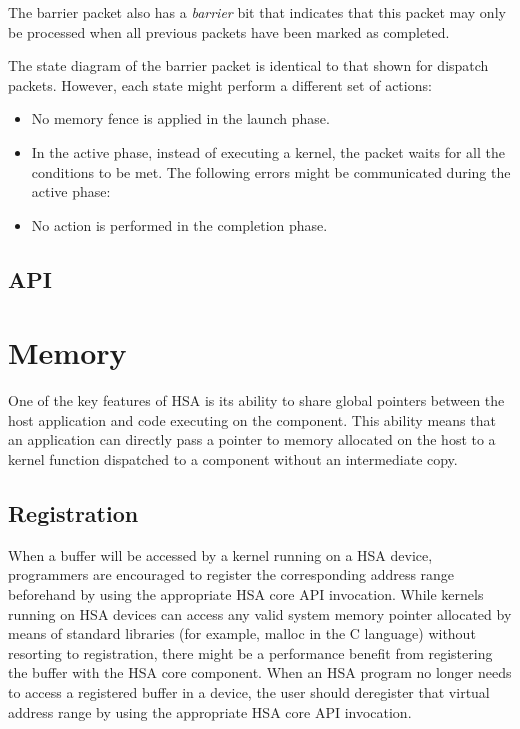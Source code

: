 \documentclass[final]{book}
\newcommand{\reffld}[1]{\textit{#1}}
\begin{document}
The barrier packet also has a \reffld{barrier} bit that indicates that this
packet may only be processed when all previous packets have been marked as
completed.

The state diagram of the barrier packet is identical to that shown for dispatch
packets. However, each state might perform a different set of actions:
\begin{itemize}
\item No memory fence is applied in the launch phase.
\item In the active phase, instead of executing a kernel, the packet waits for
  all the conditions to be met. The following errors might be communicated
  during the active phase: 
\item No action is performed in the completion phase.
\end{itemize}

\subsection{API}


\section{Memory}\label{memory}\hypertarget{memory}{}

One of the key features of HSA is its ability to share global pointers between
the host application and code executing on the component. This ability means
that an application can directly pass a pointer to memory allocated on the host
to a kernel function dispatched to a component without an intermediate copy.

\hypertarget{memory-registration}{}\subsection{Registration}\label{memory-registration}

When a buffer will be accessed by a kernel running on a HSA device, programmers
are encouraged to register the corresponding address range beforehand by using
the appropriate HSA core API invocation. While kernels running on HSA devices
can access any valid system memory pointer allocated by means of standard
libraries (for example, malloc in the C language) without resorting to
registration, there might be a performance benefit from registering the buffer
with the HSA core component. When an HSA program no longer needs to access a
registered buffer in a device, the user should deregister that virtual address
range by using the appropriate HSA core API invocation.
\end{document}
